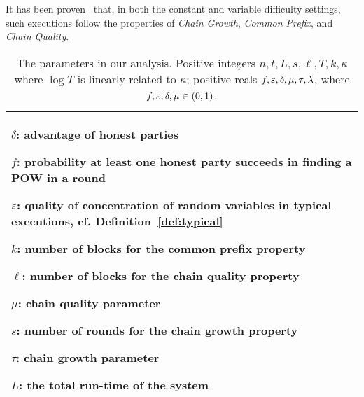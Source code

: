 %
%
It has been proven~\cite{backbone,varbackbone} that, in both the
constant and variable difficulty settings, such executions
follow the properties of \emph{Chain Growth}, \emph{Common Prefix}, and
\emph{Chain Quality}.


\begin{table}
\begin{center}
\begin{tabular}{|p{\columnwidth}|}
\hline
$\delta$: advantage of honest parties%

$f$: probability at least one honest party succeeds in finding a POW in a round

$\varepsilon$: quality of concentration of random variables in typical executions,
cf. Definition~\ref{def:typical}

$k$: number of blocks for the common prefix property

$\ell$: number of blocks for the chain quality property

$\mu$: chain quality parameter

$s$:  number of rounds for the chain growth property

$\tau$: chain growth parameter

$L$: the total run-time of the system \\

\hline
\end{tabular}
\end{center}
\caption{\label{tab:requirements}
The parameters in our analysis. Positive integers $n,t,L,s,\ell,T,k,\kappa$ where $\log T$ is linearly related to $\kappa$; positive reals
$f,\varepsilon,\delta,\mu,\tau,\lambda$, where $f,\varepsilon,\delta,\mu\in(0,1)$.}
\end{table}%

